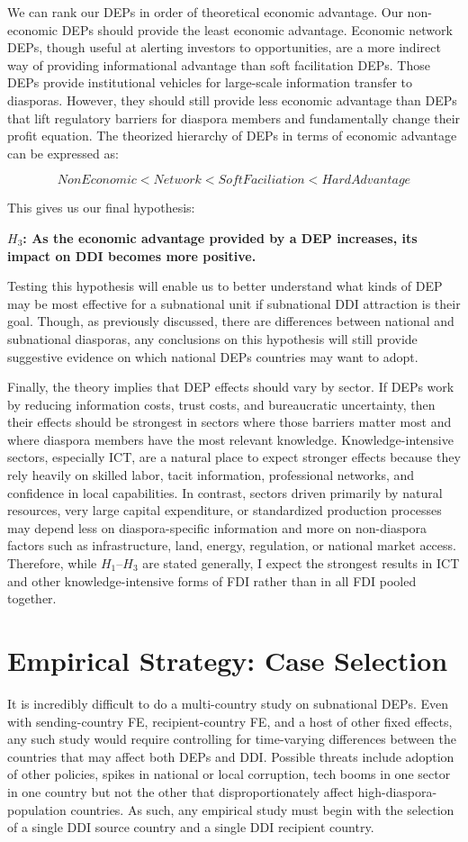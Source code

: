 \documentclass[doublespace,nopageskip]{UVAthesis}
\begin{document}
We can rank our DEPs in order of theoretical economic advantage. Our non-economic DEPs should provide the least economic advantage. Economic network DEPs, though useful at alerting investors to opportunities, are a more indirect way of providing informational advantage than soft facilitation DEPs. Those DEPs provide institutional vehicles for large-scale information transfer to diasporas. However, they should still provide less economic advantage than DEPs that lift regulatory barriers for diaspora members and fundamentally change their profit equation. The theorized hierarchy of DEPs in terms of economic advantage can be expressed as:

\[
NonEconomic < Network < SoftFaciliation < HardAdvantage
\]

This gives us our final hypothesis:

\textbf{$H_3$: As the economic advantage provided by a DEP increases, its impact on DDI becomes more positive.}

Testing this hypothesis will enable us to better understand what kinds of DEP may be most effective for a subnational unit if subnational DDI attraction is their goal. Though, as previously discussed, there are differences between national and subnational diasporas, any conclusions on this hypothesis will still provide suggestive evidence on which national DEPs countries may want to adopt.

Finally, the theory implies that DEP effects should vary by sector. If DEPs work by reducing information costs, trust costs, and bureaucratic uncertainty, then their effects should be strongest in sectors where those barriers matter most and where diaspora members have the most relevant knowledge. Knowledge-intensive sectors, especially ICT, are a natural place to expect stronger effects because they rely heavily on skilled labor, tacit information, professional networks, and confidence in local capabilities. In contrast, sectors driven primarily by natural resources, very large capital expenditure, or standardized production processes may depend less on diaspora-specific information and more on non-diaspora factors such as infrastructure, land, energy, regulation, or national market access. Therefore, while $H_1$--$H_3$ are stated generally, I expect the strongest results in ICT and other knowledge-intensive forms of FDI rather than in all FDI pooled together.
        
    \chapter{Empirical Strategy: Case Selection} \label{ch:case selection}
It is incredibly difficult to do a multi-country study on subnational DEPs. Even with sending-country FE, recipient-country FE, and a host of other fixed effects, any such study would require controlling for time-varying differences between the countries that may affect both DEPs and DDI. Possible threats include adoption of other policies, spikes in national or local corruption, tech booms in one sector in one country but not the other that disproportionately affect high-diaspora-population countries. As such, any empirical study must begin with the selection of a single DDI source country and a single DDI recipient country. 
\end{document}
